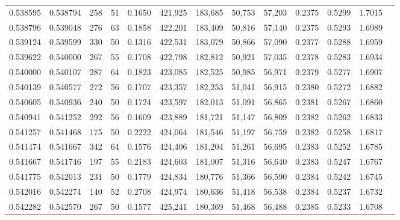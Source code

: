 \begin{tabular}{rrrrrrrrrrrrr}
0.538595 & 0.538794 &    258 &    51 &                                     0.1650 & 421,925 & 183,685 &  50,753 &  57,203 & 0.2375 & 0.5299 & 1.7015 \\
0.538796 & 0.539048 &    276 &    63 &                                     0.1858 & 422,201 & 183,409 &  50,816 &  57,140 & 0.2375 & 0.5293 & 1.6989 \\
0.539124 & 0.539599 &    330 &    50 &                                     0.1316 & 422,531 & 183,079 &  50,866 &  57,090 & 0.2377 & 0.5288 & 1.6959 \\
0.539622 & 0.540000 &    267 &    55 &                                     0.1708 & 422,798 & 182,812 &  50,921 &  57,035 & 0.2378 & 0.5283 & 1.6934 \\
0.540000 & 0.540107 &    287 &    64 &                                     0.1823 & 423,085 & 182,525 &  50,985 &  56,971 & 0.2379 & 0.5277 & 1.6907 \\
0.540139 & 0.540577 &    272 &    56 &                                     0.1707 & 423,357 & 182,253 &  51,041 &  56,915 & 0.2380 & 0.5272 & 1.6882 \\
0.540605 & 0.540936 &    240 &    50 &                                     0.1724 & 423,597 & 182,013 &  51,091 &  56,865 & 0.2381 & 0.5267 & 1.6860 \\
0.540941 & 0.541252 &    292 &    56 &                                     0.1609 & 423,889 & 181,721 &  51,147 &  56,809 & 0.2382 & 0.5262 & 1.6833 \\
0.541257 & 0.541468 &    175 &    50 &                                     0.2222 & 424,064 & 181,546 &  51,197 &  56,759 & 0.2382 & 0.5258 & 1.6817 \\
0.541474 & 0.541667 &    342 &    64 &                                     0.1576 & 424,406 & 181,204 &  51,261 &  56,695 & 0.2383 & 0.5252 & 1.6785 \\
0.541667 & 0.541746 &    197 &    55 &                                     0.2183 & 424,603 & 181,007 &  51,316 &  56,640 & 0.2383 & 0.5247 & 1.6767 \\
0.541775 & 0.542013 &    231 &    50 &                                     0.1779 & 424,834 & 180,776 &  51,366 &  56,590 & 0.2384 & 0.5242 & 1.6745 \\
0.542016 & 0.542274 &    140 &    52 &                                     0.2708 & 424,974 & 180,636 &  51,418 &  56,538 & 0.2384 & 0.5237 & 1.6732 \\
0.542282 & 0.542570 &    267 &    50 &                                     0.1577 & 425,241 & 180,369 &  51,468 &  56,488 & 0.2385 & 0.5233 & 1.6708 \\

\end{tabular}

